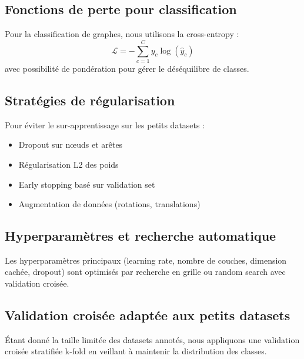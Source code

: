 \subsection{Fonctions de perte pour classification}

Pour la classification de graphes, nous utilisons la cross-entropy :
\[
\mathcal{L} = -\sum_{c=1}^C y_c \log(\hat{y}_c)
\]
avec possibilité de pondération pour gérer le déséquilibre de classes.

\subsection{Stratégies de régularisation}

Pour éviter le sur-apprentissage sur les petits datasets :
\begin{itemize}
    \item Dropout sur nœuds et arêtes
    \item Régularisation L2 des poids
    \item Early stopping basé sur validation set
    \item Augmentation de données (rotations, translations)
\end{itemize}

\subsection{Hyperparamètres et recherche automatique}

Les hyperparamètres principaux (learning rate, nombre de couches, dimension cachée, dropout) sont optimisés par recherche en grille ou random search avec validation croisée.

\subsection{Validation croisée adaptée aux petits datasets}

Étant donné la taille limitée des datasets annotés, nous appliquons une validation croisée stratifiée k-fold en veillant à maintenir la distribution des classes.
